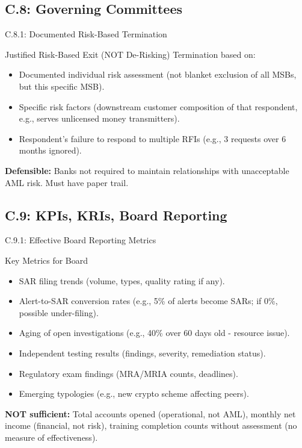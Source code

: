 \documentclass{beamer}
\begin{document}
	\subsection{C.8: Governing Committees}
	
	\begin{frame}{C.8.1: Documented Risk-Based Termination}
		\begin{block}{Justified Risk-Based Exit (NOT De-Risking)}
			Termination based on:
			\begin{itemize}
				\item Documented individual risk assessment (not blanket exclusion of all MSBs, but this specific MSB).
				\item Specific risk factors (downstream customer composition of that respondent, e.g., serves unlicensed money transmitters).
				\item Respondent's failure to respond to multiple RFIs (e.g., 3 requests over 6 months ignored).
			\end{itemize}
		\end{block}
		\textbf{Defensible:} Banks not required to maintain relationships with unacceptable AML risk. Must have paper trail.
	\end{frame}
	
	\subsection{C.9: KPIs, KRIs, Board Reporting}
	
	\begin{frame}{C.9.1: Effective Board Reporting Metrics}
		\begin{block}{Key Metrics for Board}
			\begin{itemize}
				\item SAR filing trends (volume, types, quality rating if any).
				\item Alert-to-SAR conversion rates (e.g., 5\% of alerts become SARs; if 0\%, possible under-filing).
				\item Aging of open investigations (e.g., 40\% over 60 days old - resource issue).
				\item Independent testing results (findings, severity, remediation status).
				\item Regulatory exam findings (MRA/MRIA counts, deadlines).
				\item Emerging typologies (e.g., new crypto scheme affecting peers).
			\end{itemize}
		\end{block}
		\textbf{NOT sufficient:} Total accounts opened (operational, not AML), monthly net income (financial, not risk), training completion counts without assessment (no measure of effectiveness).
	\end{frame}
	
\end{document}
